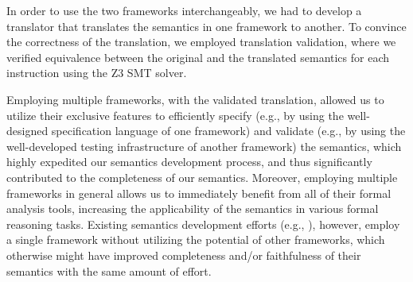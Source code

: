 {In order to use the two frameworks interchangeably, we had to develop a translator that translates the semantics in one framework to another. To convince the correctness of the translation, we employed translation validation, where we verified equivalence between the original and the translated semantics for each instruction using the Z3 SMT solver. 

Employing multiple frameworks, with the validated translation, allowed us to utilize their exclusive features to efficiently specify (e.g., by using the well-designed specification language of one framework) and validate (e.g., by using the well-developed testing infrastructure of another framework) the semantics, which highly expedited our semantics development process, and thus significantly contributed to the completeness of our semantics.
Moreover, employing multiple frameworks in general allows us to immediately benefit from all of their formal analysis tools, increasing the applicability of the semantics in various formal reasoning tasks.
Existing semantics development efforts (e.g., \cite{Goel:FMCAD14,Heule2016a}), however, %
employ a single framework without utilizing the potential of other frameworks, which otherwise might have improved completeness and/or faithfulness of their semantics with the same amount of effort.

}

